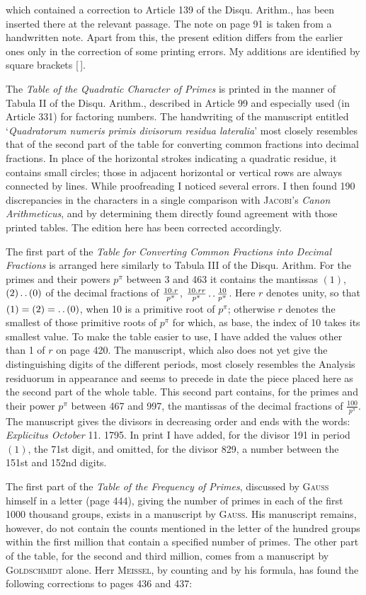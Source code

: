 which contained a correction to Article 139 of the Disqu. Arithm., has been inserted there at the relevant passage. The note on page 91 is taken from a handwritten note. Apart from this, the present edition differs from the earlier ones only in the correction of some printing errors. My additions are identified by square brackets [\,].
\par The \textit{Table of the Quadratic Character of Primes} is printed in the manner of Tabula II of the Disqu. Arithm., described in Article 99 and especially used (in Article 331) for factoring numbers. The handwriting of the manuscript entitled ‘\textit{Quadratorum numeris primis divisorum residua lateralia}’ most closely resembles that of the second part of the table for converting common fractions into decimal fractions. In place of the horizontal strokes indicating a quadratic residue, it contains small circles; those in adjacent horizontal or vertical rows are always connected by lines. While proofreading I noticed several errors. I then found 190 discrepancies in the characters in a single comparison with \textsc{Jacobi}’s \textit{Canon Arithmeticus}, and by determining them directly found agreement with those printed tables. The edition here has been corrected accordingly.
\par The first part of the \textit{Table for Converting Common Fractions into Decimal Fractions} is arranged here similarly to Tabula III of the Disqu. Arithm. For the primes and their powers $p^\pi$ between 3 and 463 it contains the mantissas $(1)$, $(2)\mathinner{.\,.}(0)$ of the decimal fractions of $\frac{10\mathbin{.} r}{p^\pi}$, $\frac{10\mathbin{.} rr}{p^\pi}\mathinner{.\,.}\frac{10}{p^\pi}$. Here $r$ denotes unity, so that $(1)=(2)=\mathinner{.\,.}(0)$, when 10 is a primitive root of $p^\pi$; otherwise $r$ denotes the smallest of those primitive roots of $p^\pi$ for which, as base, the index of 10 takes its smallest value. To make the table easier to use, I have added the values other than 1 of $r$ on page 420. The manuscript, which also does not yet give the distinguishing digits of the different periods, most closely resembles the Analysis residuorum in appearance and seems to precede in date the piece placed here as the second part of the whole table.
This second part contains, for the primes and their power $p^\pi$ between 467 and 997, the mantissas of the decimal fractions of $\frac{100}{p^\pi}$. The manuscript gives the divisors in decreasing order and ends with the words: \textit{Explicitus October} 11. 1795. In print I have added, for the divisor 191 in period $(1)$, the 71st digit, and omitted, for the divisor 829, a number between the 151st and 152nd digits.
\par The first part of the \textit{Table of the Frequency of Primes}, discussed by \textsc{Gauss} himself in a letter (page 444), giving the number of primes in each of the first 1000 thousand groups, exists in a manuscript by \textsc{Gauss}. His manuscript remains, however, do not contain the counts mentioned in the letter of the hundred groups within the first million that contain a specified number of primes. The other part of the table, for the second and third million, comes from a manuscript by \textsc{Goldschmidt} alone. Herr \textsc{Meissel}, by counting and by his formula, has found the following corrections to pages 436 and 437:
